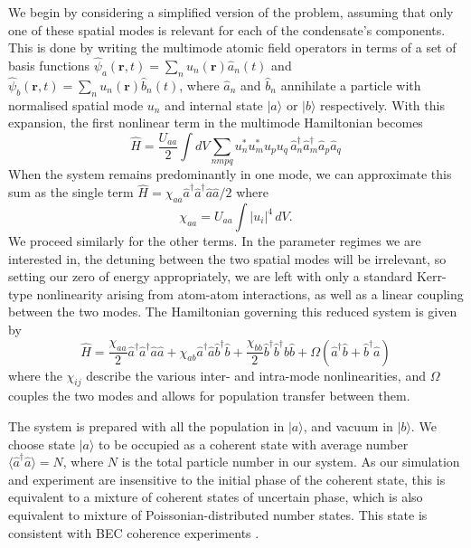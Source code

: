 \documentclass{iopart}
\begin{document}
We begin by considering a simplified version of the problem, assuming that only one of these spatial modes is relevant for each of the condensate's components.  This is done by writing the multimode atomic field operators in terms of a set of basis functions $\hat{\psi}_a({\mathbf{r}},t) = \sum_n u_{n}({\mathbf{r}}) \hat{a}_{n}(t)$ and $\hat{\psi}_b({\mathbf{r}},t) = \sum_n u_{n}({\mathbf{r}}) \hat{b}_{n}(t)$, where $\hat{a}_{n}$ and $\hat{b}_{n}$ annihilate a particle with normalised spatial mode $u_n$ and internal state $|a\rangle$ or $|b\rangle$ respectively. With this expansion, the first nonlinear term in the multimode Hamiltonian becomes
\begin{equation}
\hat{H} = \frac{U_{aa}}{2} \int dV \sum_{nmpq} u_n^* u_m^* u_p u_q \, \hat{a}^{\dagger}_{n} \hat{a}^{\dagger}_{m} \hat{a}_{p} \hat{a}_{q} 
\end{equation}
When the system remains predominantly in one mode, we can approximate this sum as the single term $\hat{H} = \chi_{aa} \hat{a}^{\dagger} \hat{a}^{\dagger} \hat{a} \hat{a}/2$ where
\begin{equation}
\chi_{aa} = U_{aa} \int |u_i|^4 \, dV.
\label{eqChiUequivalence}
\end{equation}
We proceed similarly for the other terms.  In the parameter regimes we are interested in, the detuning between the two spatial modes will be irrelevant, so setting our zero of energy appropriately, we are left with only a standard Kerr-type nonlinearity arising from atom-atom interactions, as well as a linear coupling between the two modes.  The Hamiltonian governing this reduced system is given by
\begin{equation}
\hat{H} = \frac{\chi_{aa}}{2} \hat{a}^{\dagger} \hat{a}^{\dagger} \hat{a} \hat{a}
          + \chi_{ab} \hat{a}^{\dagger} \hat{a} \hat{b}^{\dagger} \hat{b}
          + \frac{\chi_{bb}}{2} \hat{b}^{\dagger} \hat{b}^{\dagger} \hat{b} \hat{b}
          + \Omega (\hat{a}^{\dagger} \hat{b} + \hat{b}^{\dagger}  \hat{a} )
\label{eqTwoModeHamiltonian}
\end{equation}
where the $\chi_{ij}$ describe the various inter- and intra-mode nonlinearities, and $\Omega$ couples the two modes and allows for population transfer between them.

The system is prepared with all the population in $|a\rangle$, and vacuum in $|b\rangle$. We choose state $|a\rangle$ to be occupied as a coherent state with average number $\langle \hat{a}^{\dagger} \hat{a} \rangle = N$, where $N$ is the total particle number in our system.  As our simulation and experiment are insensitive to the initial phase of the coherent state, this is equivalent to a mixture of coherent states of uncertain phase, which is also equivalent to mixture of Poissonian-distributed number states.  This state is consistent with BEC coherence experiments \cite{Hadzibabic2004}.  
\end{document}
